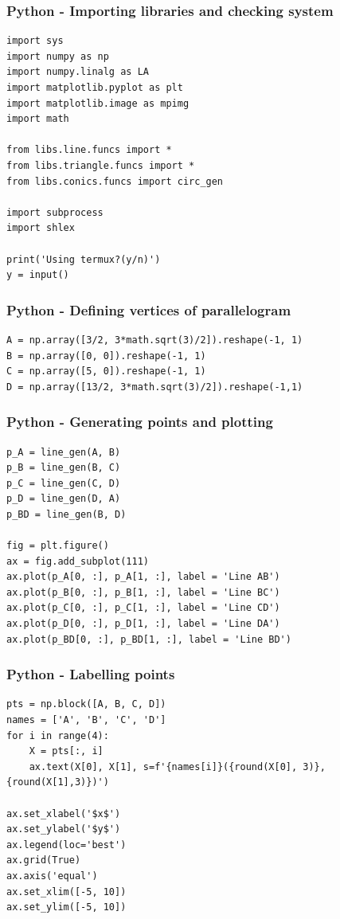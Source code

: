 \documentclass{beamer}
\begin{document}
\begin{frame}[fragile]
    \frametitle{Python - Importing libraries and checking system}
    \begin{lstlisting}
import sys
import numpy as np
import numpy.linalg as LA
import matplotlib.pyplot as plt
import matplotlib.image as mpimg
import math

from libs.line.funcs import *
from libs.triangle.funcs import *
from libs.conics.funcs import circ_gen

import subprocess
import shlex

print('Using termux?(y/n)')
y = input()
\end{lstlisting}
\end{frame}

\begin{frame}[fragile]
    \frametitle{Python - Defining vertices of parallelogram}
    \begin{lstlisting}
A = np.array([3/2, 3*math.sqrt(3)/2]).reshape(-1, 1)
B = np.array([0, 0]).reshape(-1, 1)
C = np.array([5, 0]).reshape(-1, 1)
D = np.array([13/2, 3*math.sqrt(3)/2]).reshape(-1,1)
\end{lstlisting}
\end{frame}

\begin{frame}[fragile]
    \frametitle{Python - Generating points and plotting}
    \begin{lstlisting}
p_A = line_gen(A, B)
p_B = line_gen(B, C)
p_C = line_gen(C, D)
p_D = line_gen(D, A)
p_BD = line_gen(B, D)

fig = plt.figure()
ax = fig.add_subplot(111)
ax.plot(p_A[0, :], p_A[1, :], label = 'Line AB')
ax.plot(p_B[0, :], p_B[1, :], label = 'Line BC')
ax.plot(p_C[0, :], p_C[1, :], label = 'Line CD')
ax.plot(p_D[0, :], p_D[1, :], label = 'Line DA')
ax.plot(p_BD[0, :], p_BD[1, :], label = 'Line BD')
\end{lstlisting}
\end{frame}

\begin{frame}[fragile]
    \frametitle{Python - Labelling points}
    \begin{lstlisting}
pts = np.block([A, B, C, D])
names = ['A', 'B', 'C', 'D']
for i in range(4):
    X = pts[:, i]
    ax.text(X[0], X[1], s=f'{names[i]}({round(X[0], 3)}, {round(X[1],3)})')

ax.set_xlabel('$x$')
ax.set_ylabel('$y$')
ax.legend(loc='best')
ax.grid(True) 
ax.axis('equal')
ax.set_xlim([-5, 10])
ax.set_ylim([-5, 10])
    \end{lstlisting}
\end{frame}
\end{document}
